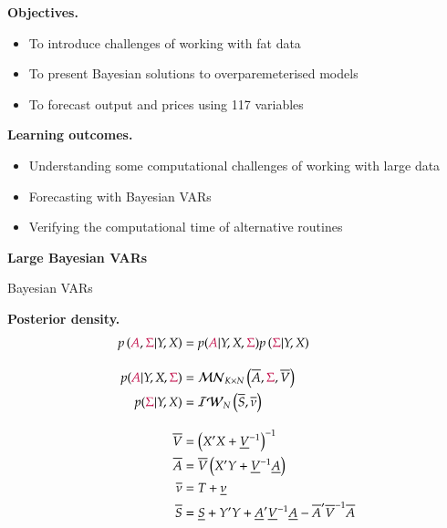 \documentclass[notes,blackandwhite,mathsans,usenames,dvipsnames]{beamer}
\begin{document}
{
\begin{frame}

\bigskip\textbf{\color{mcxs1}Objectives.}
\begin{itemize}[label=$\blacktriangleright$]
\item {\color{mcxs1}To introduce challenges of working with fat data}
\item {\color{mcxs1}To present Bayesian solutions to overparemeterised models}
\item {\color{mcxs1}To forecast output and prices using 117 variables}
\end{itemize}

\bigskip\textbf{\color{mcxs5}Learning outcomes.}
\begin{itemize}[label=$\blacktriangleright$]
\item {\color{mcxs5}Understanding some computational challenges of working with large data}
\item {\color{mcxs5}Forecasting with Bayesian VARs}
\item {\color{mcxs5}Verifying the computational time of alternative routines}
\end{itemize}

\end{frame}
}




{
\begin{frame}

\begin{adjustwidth}{-0.5cm}{0cm}
\vspace{8.3cm}\Large
\textbf{{\color{mcxs1}Large} {\color{white}Bayesian VARs}}
\end{adjustwidth}

\end{frame}
}





\begin{frame}{Bayesian VARs}

\textbf{Posterior density.}
\begin{align*} 
p\left( {\color{purple}A}, {\color{purple}\Sigma}|Y,X \right) &= p({\color{purple}A}|Y,X,{\color{purple}\Sigma})p\left( {\color{purple}\Sigma}|Y,X \right)\\[2ex]
p({\color{purple}A}|Y,X,{\color{purple}\Sigma}) &= \mathcal{MN}_{K\times N}\left( \overline{A},{\color{purple}\Sigma},\overline{V} \right)\\
p({\color{purple}\Sigma}|Y,X) &= \mathcal{IW}_N\left( \overline{S}, \overline{\nu} \right)\\[2ex]
\overline{V}&= \left( X'X + \underline{V}^{-1}\right)^{-1} \\
\overline{A}&= \overline{V}\left( X'Y + \underline{V}^{-1}\underline{A} \right)\\
\overline{\nu}&= T+\underline{\nu}\\
\overline{S}&= \underline{S}+Y'Y + \underline{A}'\underline{V}^{-1}\underline{A} - \overline{A}'\overline{V}^{-1}\overline{A}
\end{align*} 

\end{frame}
\end{document}
